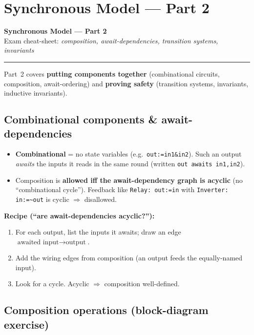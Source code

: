 \chapter{Synchronous Model --- Part 2}

\begin{center}
{\Large\bfseries Synchronous Model --- Part 2}\\[1pt]
{\small Exam cheat-sheet: \emph{composition, await-dependencies, transition systems, invariants}}
\end{center}
\hrule
\vspace{4pt}

Part~2 covers \textbf{putting components together} (combinational circuits,
composition, await-ordering) and \textbf{proving safety} (transition systems,
invariants, inductive invariants).

\section{Combinational components \& await-dependencies}

\begin{itemize}
  \item \textbf{Combinational} = no state variables (e.g.\ \texttt{out:=in1\&in2}).
        Such an output \emph{awaits} the inputs it reads in the same round
        (written \texttt{out awaits in1,in2}).
  \item Composition is \textbf{allowed iff the await-dependency graph is acyclic}
        (no ``combinational cycle''). Feedback like \texttt{Relay: out:=in} with
        \texttt{Inverter: in:=\textasciitilde out} is cyclic $\Rightarrow$ disallowed.
\end{itemize}

\textbf{Recipe (``are await-dependencies acyclic?''):}
\begin{enumerate}
  \item For each output, list the inputs it awaits; draw an edge
        $\text{awaited input}\to\text{output}$.
  \item Add the wiring edges from composition (an output feeds the equally-named input).
  \item Look for a cycle. Acyclic $\Rightarrow$ composition well-defined.
\end{enumerate}

\section{Composition operations (block-diagram exercise)}

